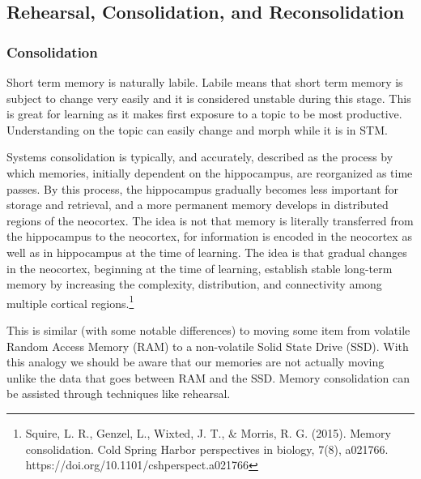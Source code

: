 \documentclass{article}[12pt]
\begin{document}
\subsection{Rehearsal, Consolidation, and Reconsolidation}
\subsubsection{Consolidation}
Short term memory is naturally labile. Labile means that short term memory is subject to change very easily and it is considered unstable during this stage. This is great for learning as it makes first exposure to a topic to be most productive. Understanding on the topic can easily change and morph while it is in STM.

\begin{displayquote}

Systems consolidation is typically, and accurately, described as the process by which memories, initially dependent on the hippocampus, are reorganized as time passes. By this process, the hippocampus gradually becomes less important for storage and retrieval, and a more permanent memory develops in distributed regions of the neocortex. The idea is not that memory is literally transferred from the hippocampus to the neocortex, for information is encoded in the neocortex as well as in hippocampus at the time of learning. The idea is that gradual changes in the neocortex, beginning at the time of learning, establish stable long-term memory by increasing the complexity, distribution, and connectivity among multiple cortical regions.\footnote{\raggedright Squire, L. R., Genzel, L., Wixted, J. T., \& Morris, R. G. (2015). Memory consolidation. Cold Spring Harbor perspectives in biology, 7(8), a021766. https://doi.org/10.1101/cshperspect.a021766}

\end{displayquote}

This is similar (with some notable differences) to moving some item from volatile Random Access Memory (RAM) to a non-volatile Solid State Drive (SSD). With this analogy we should be aware that our memories are not actually moving unlike the data that goes between RAM and the SSD. Memory consolidation can be assisted through techniques like rehearsal. 
\end{document}
